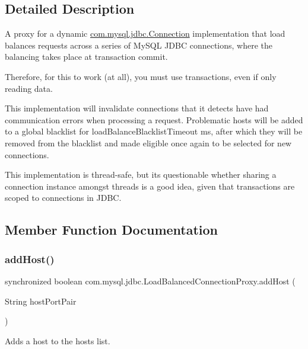 \subsection{Detailed Description}
A proxy for a dynamic \mbox{\hyperlink{interfacecom_1_1mysql_1_1jdbc_1_1_connection}{com.\+mysql.\+jdbc.\+Connection}} implementation that load balances requests across a series of My\+S\+QL J\+D\+BC connections, where the balancing takes place at transaction commit.

Therefore, for this to work (at all), you must use transactions, even if only reading data.

This implementation will invalidate connections that it detects have had communication errors when processing a request. Problematic hosts will be added to a global blacklist for load\+Balance\+Blacklist\+Timeout ms, after which they will be removed from the blacklist and made eligible once again to be selected for new connections.

This implementation is thread-\/safe, but it\textquotesingle{}s questionable whether sharing a connection instance amongst threads is a good idea, given that transactions are scoped to connections in J\+D\+BC. 

\subsection{Member Function Documentation}
\mbox{\label{classcom_1_1mysql_1_1jdbc_1_1_load_balanced_connection_proxy_afad99a08e4cfd9adad2936525d56d49e}} 
\subsubsection{\texorpdfstring{add\+Host()}{addHost()}}
{\footnotesize\ttfamily synchronized boolean com.\+mysql.\+jdbc.\+Load\+Balanced\+Connection\+Proxy.\+add\+Host (\begin{DoxyParamCaption}\item[{String}]{host\+Port\+Pair }\end{DoxyParamCaption})}

Adds a host to the hosts list.


